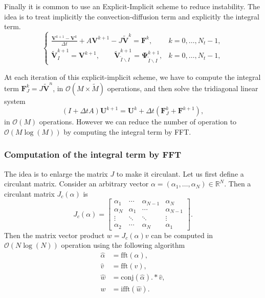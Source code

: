 Finally it is common to use an Explicit-Implicit scheme to reduce instability. The idea is to treat implicitly the convection-diffusion term and explicitly the integral term.
$$\begin{cases}
\displaystyle{\frac{\mathbf{V}^{k+1}-\mathbf{V}^k}{\Delta t}+ A\mathbf{V}^{k+1}-J\mathbf{\tilde{V}}^k = \mathbf{F}^k},&k = 0,\ldots, N_t-1,\\
\mathbf{\tilde{V}}_I^{k+1} = \mathbf{V}^{k+1},\qquad \mathbf{\tilde{V}}_{\tilde{I}\backslash I}^{k+1}=\mathbf{\Psi}_{\tilde{I}\backslash I}^{k+1}, &k = 0,\ldots, N_t-1,
\end{cases}$$

At each iteration of this explicit-implicit scheme, we have to compute the integral term $\mathbf{F}^k_J = J\mathbf{\tilde{V}}^n$, in $\mathcal{O}(M\times \tilde{M})$ operations, and then solve the tridiagonal linear system
$$(I+\Delta t A)\mathbf{U}^{k+1} = \mathbf{U}^k +\Delta t\left(\mathbf{F}^k_J+\mathbf{F}^{k+1}\right),$$ 
in $\mathcal{O}(M)$ operations.
However we can reduce the number of operation to $\mathcal{O}(M\log(M))$ by computing the integral term by FFT.

\subsubsection{Computation of the integral term by FFT}
The idea is to enlarge the matrix $J$ to make it circulant. Let us first define a circulant matrix. Consider an arbitrary vector $\alpha = (\alpha_1, \ldots, \alpha_N) \in\mathbb{R}^N$. Then a circulant matrix $J_c(\alpha)$ is
$$J_c(\alpha)=\left[
\begin{matrix}
\alpha_1 & \cdots & \alpha_{N-1} & \alpha_N \\
\alpha_N & \alpha_1 & \cdots & \alpha_{N-1} \\
\vdots & \ddots & \ddots & \vdots \\
\alpha_2& \cdots & \alpha_N &\alpha_1
\end{matrix}
\right].$$
Then the matrix vector product $w = J_c(\alpha)v$ can be computed in $\mathcal{O}(N\log(N))$ operation using the following algorithm
\begin{align*}
\hat{\alpha}&=\text{fft}(\alpha),\\
\hat{v}&=\text{fft}(v),\\
\hat{w}&= \text{conj}(\hat{\alpha}).*\hat{v},\\
w &= \text{ifft}(\hat{w}).
\end{align*}

